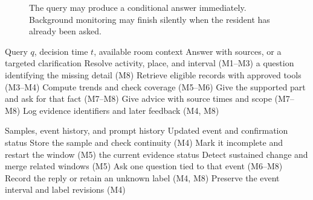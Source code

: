\documentclass[conference]{IEEEtran}
\begin{document}
\begin{figure}[t]
\centering
{}
\caption{The query may produce a conditional answer immediately. Background monitoring may finish silently when the resident has already been asked.}
\label{fig:paths}
\end{figure}

\begin{algorithm}[t]
\caption{Answer a household query (M1--M8)}\label{alg:query}
\begin{algorithmic}[1]
\Require Query $q$, decision time $t$, available room context
\Ensure Answer with sources, or a targeted clarification
\State Resolve activity, place, and interval (M1--M3)
  \State \Return a question identifying the missing detail (M8)
\EndIf
\State Retrieve eligible records with approved tools (M3--M4)
\State Compute trends and check coverage (M5--M6)
  \State Give the supported part and ask for that fact (M7--M8)
\Else
  \State Give advice with source times and scope (M7--M8)
\EndIf
\State Log evidence identifiers and later feedback (M4, M8)
\end{algorithmic}
\end{algorithm}
\begin{algorithm}[t]
\caption{Monitor events and collect feedback (M4--M8)}\label{alg:monitor}
\begin{algorithmic}[1]
\Require Samples, event history, and prompt history
\Ensure Updated event and confirmation status
\State Store the sample and check continuity (M4)
  \State Mark it incomplete and restart the window (M5)
  \State \Return the current evidence status
\EndIf
\State Detect sustained change and merge related windows (M5)
  \State Ask one question tied to that event (M6--M8)
  \State Record the reply or retain an unknown label (M4, M8)
\EndIf
\State Preserve the event interval and label revisions (M4)
\end{algorithmic}
\end{algorithm}
\end{document}
